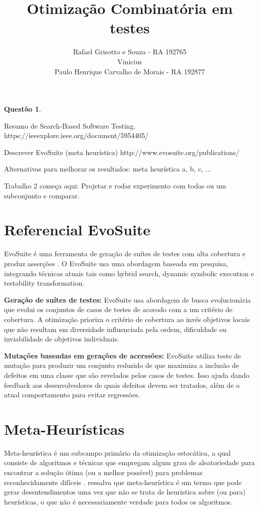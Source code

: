 \documentclass[12pt,a4paper]{article}
\title{Otimização Combinatória em  \\ testes}
\author{Rafael Grisotto e Souza - RA 192765\\ Vinicius \\ Paulo Henrique Carvalho de Morais - RA 192877}
\newtheorem{questao}{Questão}
\begin{document}
\maketitle


\begin{questao}
\end{questao}

Resumo de Search-Based Software Testing.
https://ieeexplore.ieee.org/document/5954405/

Descrever EvoSuite (meta heurística)
http://www.evosuite.org/publications/

Alternativas para melhorar os resultados: meta heurística a, b, c, ...


Trabalho 2 começa aqui:
\cite{arcuri2017restful}
Projetar e rodar experimento com todas ou um subconjunto e comparar.





\newpage

\section{Referencial EvoSuite}
EvoSuite é uma ferramenta de geração de suítes de testes com alta cobertura e produz asserções \cite{fraser2011evosuite}. O EvoSuite usa uma abordagem baseada em pesquisa, integrando técnicas atuais tais como hybrid search, dynamic symbolic execution e testability transformation.

\textbf{Geração de suítes de testes:} EvoSuite usa abordagem de busca evolucionária que evolui os conjuntos de casos de testes de acorodo com a um critério de cobertura. A otimização prioriza o critério de cobertura ao invés objetivos locais que não resultam em diversidade influenciada pela ordem, dificuldade ou inviabilidade de objetivos individuais.

\textbf{Mutações baseadas em gerações de acerssões:} EvoSuite utiliza teste de mutação para produzir um conjunto reduzido de que maximiza a inclusão de defeitos em uma classe que são revelados pelos casos de testes. Isso ajuda dando feedback aos desenvolvedores de quais defeitos devem ser tratados, além de o atual comportamento para evitar regressões.



\section{Meta-Heurísticas}
Meta-heurística é um subcampo primário da otimização estocática, a qual consiste de algoritmos e técnicas que empregam algum grau de aleatoriedade para encontrar a solução ótima (ou a melhor possível) para problemas reconhecidamente difíceis \cite{luke2009essentials}. \citeauthor{luke2009essentials} ressalva que meta-heurística é um termo que pode gerar desentendimentos uma vez que não se trata de heuristica sobre (ou para) heurísticas, o que não é necessariamente verdade para todos os algoritmos. 
\end{document}
